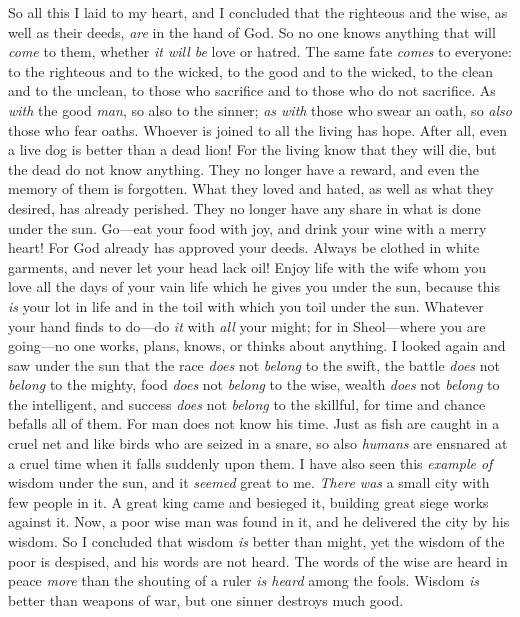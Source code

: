 \begin{biblechapter} %
 So all this I laid to my heart, and I concluded that the righteous and the wise, as well as their deeds, \textit{are} in the hand of God. So no one knows anything that will \textit{come} to them, whether \textit{it will be} love or hatred.
\verse The same fate \textit{comes} to everyone:
\verse to the righteous and to the wicked, 
to the good and to the wicked, 
to the clean and to the unclean, 
to those who sacrifice and to those who do not sacrifice. 
As \textit{with} the good \textit{man}, so also to the sinner; 
\textit{as with} those who swear an oath, so \textit{also} those who fear oaths.
 Whoever is joined to all the living has hope. After all, even a live dog is better than a dead lion!
\verse For the living know that they will die, but the dead do not know anything. They no longer have a reward, and even the memory of them is forgotten.
\verse What they loved and hated, as well as what they desired, has already perished. They no longer have any share in what is done under the sun.
 Go—eat your food with joy, and drink your wine with a merry heart! For God already has approved your deeds.
\verse Always be clothed in white garments, and never let your head lack oil!
\verse Enjoy life with the wife whom you love all the days of your vain life which he gives you under the sun, because this \textit{is} your lot in life and in the toil with which you toil under the sun.
\verse Whatever your hand finds to do—do \textit{it} with \textit{all} your might; for in Sheol—where you are going—no one works, plans, knows, or thinks about anything.
 I looked again and saw under the sun that the race \textit{does} not \textit{belong} to the swift, the battle \textit{does} not \textit{belong} to the mighty, food \textit{does} not \textit{belong} to the wise, wealth \textit{does} not \textit{belong} to the intelligent, and success \textit{does} not \textit{belong} to the skillful, for time and chance befalls all of them.
\verse For man does not know his time. Just as fish are caught in a cruel net and like birds who are seized in a snare, so also \textit{humans} are ensnared at a cruel time when it falls suddenly upon them.
 I have also seen this \textit{example of} wisdom under the sun, and it \textit{seemed} great to me.
\verse \textit{There was} a small city with few people in it. A great king came and besieged it, building great siege works against it.
\verse Now, a poor wise man was found in it, and he delivered the city by his wisdom.
\verse So I concluded that wisdom \textit{is} better than might, yet the wisdom of the poor is despised, and his words are not heard.
 The words of the wise are heard in peace 
\textit{more} than the shouting of a ruler \textit{is heard} among the fools.
\verse Wisdom \textit{is} better than weapons of war, 
but one sinner destroys much good.
\end{biblechapter}


